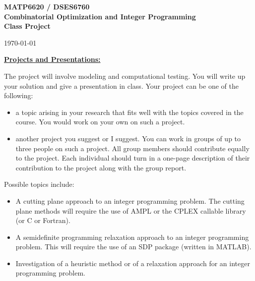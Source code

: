 \documentclass[12pt]{article}
\begin{document}
\begin{center}
  {\bf\large\bf  MATP6620 / DSES6760  \\
     Combinatorial Optimization and Integer Programming} \\
{\bf\large\bf Class Project}
\end{center}
\begin{flushright} \today \end{flushright}




\begin{flushleft}  \underline{\bf Projects and Presentations:}  \end{flushleft}

\noindent
The project will involve modeling and computational testing.
You will write up your solution and give a presentation in class.
%
Your project can be one of the following:
\begin{itemize}
\item
a topic arising in your research
that fits well with the topics covered in the course.
You would work on your own on such a project.
\item
another project you suggest or I suggest.
You can work in groups of up to three people on such
a project.
All group members should contribute equally to the project. 
Each individual should turn in a one-page description of their 
contribution to the project along with the group report.
\end{itemize}


\noindent
Possible topics include:
\begin{itemize}
\item
A cutting plane approach to an integer programming problem.
The cutting plane methods will require the use of AMPL or the CPLEX
callable library
(or C or Fortran).
\item
A semidefinite
programming relaxation approach to an integer programming problem.
This will require the use of an SDP package
(written in MATLAB).
\item
Investigation of a
heuristic method or of a relaxation approach for an integer programming problem.
\end{itemize}

\end{document}

